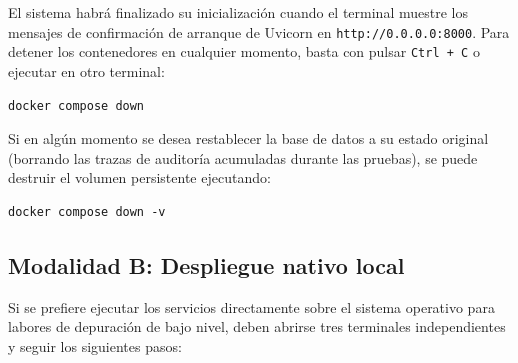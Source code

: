 El sistema habrá finalizado su inicialización cuando el terminal muestre los mensajes de confirmación de arranque de Uvicorn en \texttt{http://0.0.0.0:8000}. Para detener los contenedores en cualquier momento, basta con pulsar \texttt{Ctrl + C} o ejecutar en otro terminal:

\begin{verbatim}
docker compose down
\end{verbatim}

Si en algún momento se desea restablecer la base de datos a su estado original (borrando las trazas de auditoría acumuladas durante las pruebas), se puede destruir el volumen persistente ejecutando:

\begin{verbatim}
docker compose down -v
\end{verbatim}

\subsection{Modalidad B: Despliegue nativo local}

Si se prefiere ejecutar los servicios directamente sobre el sistema operativo para labores de depuración de bajo nivel, deben abrirse tres terminales independientes y seguir los siguientes pasos:

